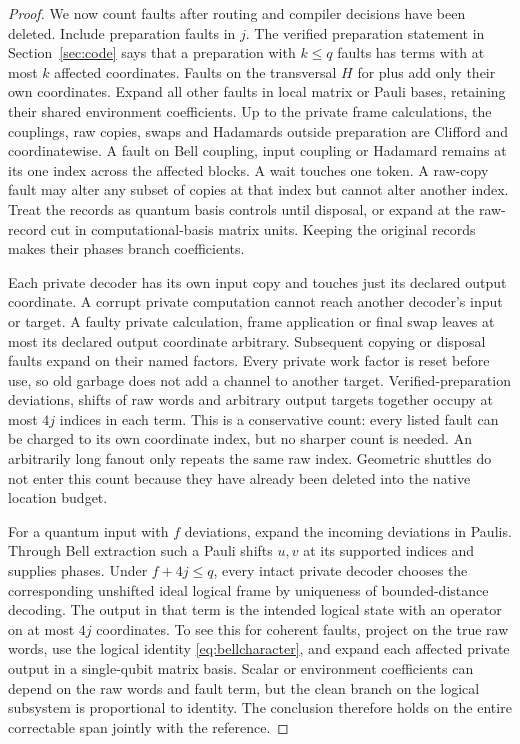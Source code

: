 \begin{proof}
We now count faults after routing and compiler decisions have been deleted. Include preparation faults in $j$. The verified preparation statement in Section~\ref{sec:code} says that a preparation with $k\le q$ faults has terms with at most $k$ affected coordinates. Faults on the transversal $H$ for plus add only their own coordinates. Expand all other faults in local matrix or Pauli bases, retaining their shared environment coefficients. Up to the private frame calculations, the couplings, raw copies, swaps and Hadamards outside preparation are Clifford and coordinatewise. A fault on Bell coupling, input coupling or Hadamard remains at its one index across the affected blocks. A wait touches one token. A raw-copy fault may alter any subset of copies at that index but cannot alter another index. Treat the records as quantum basis controls until disposal, or expand at the raw-record cut in computational-basis matrix units. Keeping the original records makes their phases branch coefficients.

Each private decoder has its own input copy and touches just its declared output coordinate. A corrupt private computation cannot reach another decoder's input or target. A faulty private calculation, frame application or final swap leaves at most its declared output coordinate arbitrary. Subsequent copying or disposal faults expand on their named factors. Every private work factor is reset before use, so old garbage does not add a channel to another target. Verified-preparation deviations, shifts of raw words and arbitrary output targets together occupy at most $4j$ indices in each term. This is a conservative count: every listed fault can be charged to its own coordinate index, but no sharper count is needed. An arbitrarily long fanout only repeats the same raw index. Geometric shuttles do not enter this count because they have already been deleted into the native location budget.

For a quantum input with $f$ deviations, expand the incoming deviations in Paulis. Through Bell extraction such a Pauli shifts $u,v$ at its supported indices and supplies phases. Under $f+4j\le q$, every intact private decoder chooses the corresponding unshifted ideal logical frame by uniqueness of bounded-distance decoding. The output in that term is the intended logical state with an operator on at most $4j$ coordinates. To see this for coherent faults, project on the true raw words, use the logical identity \eqref{eq:bellcharacter}, and expand each affected private output in a single-qubit matrix basis. Scalar or environment coefficients can depend on the raw words and fault term, but the clean branch on the logical subsystem is proportional to identity. The conclusion therefore holds on the entire correctable span jointly with the reference.


\end{proof}
